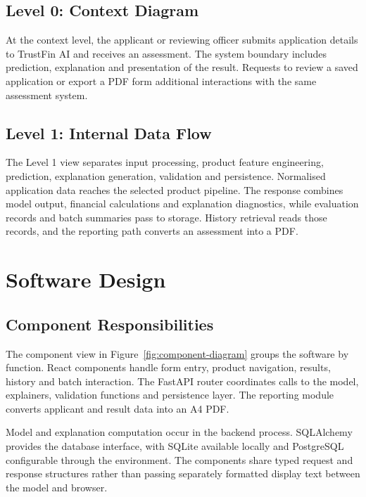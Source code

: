 \subsection{Level 0: Context Diagram}
At the context level, the applicant or reviewing officer submits application details to TrustFin AI and receives an assessment. The system boundary includes prediction, explanation and presentation of the result. Requests to review a saved application or export a PDF form additional interactions with the same assessment system.

\clearpage

\subsection{Level 1: Internal Data Flow}
The Level 1 view separates input processing, product feature engineering, prediction, explanation generation, validation and persistence. Normalised application data reaches the selected product pipeline. The response combines model output, financial calculations and explanation diagnostics, while evaluation records and batch summaries pass to storage. History retrieval reads those records, and the reporting path converts an assessment into a PDF.

\clearpage

\section{Software Design}
\subsection{Component Responsibilities}
The component view in Figure~\ref{fig:component-diagram} groups the software by function. React components handle form entry, product navigation, results, history and batch interaction. The FastAPI router coordinates calls to the model, explainers, validation functions and persistence layer. The reporting module converts applicant and result data into an A4 PDF.

Model and explanation computation occur in the backend process. SQLAlchemy provides the database interface, with SQLite available locally and PostgreSQL configurable through the environment. The components share typed request and response structures rather than passing separately formatted display text between the model and browser.

